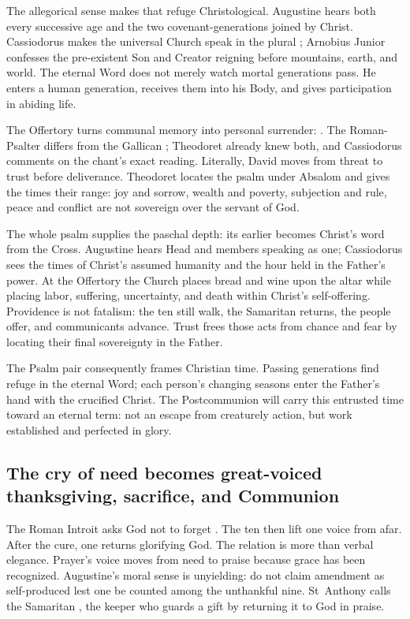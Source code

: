 The allegorical sense makes that refuge Christological. Augustine hears both
every successive age and the two covenant-generations joined by Christ.
Cassiodorus makes the universal Church speak in the plural ;
Arnobius Junior confesses the pre-existent Son and Creator reigning before
mountains, earth, and world. The eternal Word does
not merely watch mortal generations pass. He enters a human generation,
receives them into his Body, and gives participation in abiding life.

The Offertory turns communal memory into personal surrender:
. The Roman-Psalter
 differs from the Gallican ; Theodoret already
knew both, and Cassiodorus comments on the chant's exact reading. Literally,
David moves from threat to trust before deliverance. Theodoret locates the
psalm under Absalom and gives the times their range: joy and sorrow, wealth and
poverty, subjection and rule, peace and conflict are not sovereign over the
servant of God.

The whole psalm supplies the paschal depth: its earlier  becomes Christ's word from the Cross. Augustine hears
Head and members speaking as one; Cassiodorus sees the times of Christ's
assumed humanity and the hour held in the Father's power. At the Offertory the
Church places bread and wine upon the altar while placing labor, suffering,
uncertainty, and death within Christ's self-offering. Providence is not
fatalism: the ten still walk, the Samaritan returns, the people offer, and
communicants advance. Trust frees those acts from chance and fear by locating
their final sovereignty in the Father.

The Psalm pair consequently frames Christian time. Passing generations find
refuge in the eternal Word; each person's changing seasons enter the Father's
hand with the crucified Christ. The Postcommunion will carry this entrusted
time toward an eternal term: not an escape from creaturely action, but work
established and perfected in glory.

\subsection*{The cry of need becomes great-voiced thanksgiving, sacrifice, and Communion\enspace
  }

The Roman Introit asks God not to forget . The ten
then lift one voice from afar. After the cure, one returns 
glorifying God. The relation is more than verbal elegance. Prayer's voice moves
from need to praise because grace has been recognized. Augustine's moral sense
is unyielding: do not claim amendment as self-produced lest one be counted
among the unthankful nine. St~Anthony calls the Samaritan , the
keeper who guards a gift by returning it to God in praise.

